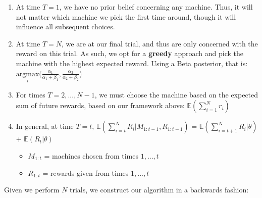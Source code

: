 \documentclass{article}
\begin{document}
\begin{enumerate}
\item At time $T = 1$, we have no prior belief concerning any machine. Thus, it will not matter which machine we pick the first time around, though it will influence all subsequent choices.
\item At time $T = N$, we are at our final trial, and thus are only concerned with the reward on this trial. As such, we opt for a \textbf{greedy} approach and pick the machine with the highest expected reward. Using a Beta posterior, that is:  $\underset{i}{\text{argmax}}(\frac{\alpha_1}{\alpha_1 + \beta_1}, \frac{\alpha_2}{\alpha_2 + \beta_2}$)
\item For times $T = 2, ..., N-1$, we must choose the machine based on the expected sum of future rewards, based on our framework above: $\mathbb{E}(\displaystyle\sum_{i=1}^{N} r_i)$
\item In general, at time $T = t$, $\mathbb{E}(\displaystyle\sum_{i=t}^{N} R_i|M_{1:t-1}, R_{1:t-1})$ = $\mathbb{E}(\displaystyle\sum_{i=t+1}^{N} R_i|\theta)$ + $\mathbb{E}(R_t|\theta)$ 
	\begin{itemize}
	\item $M_{1:t}$ = machines chosen from times $1, ..., t$ 
	\item $R_{1:t}$ = rewards given from times $1, ..., t$
	\end{itemize}
\end{enumerate}

Given we perform $N$ trials, we construct our algorithm in a backwards fashion:
\end{document}
